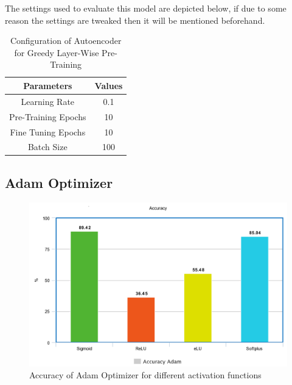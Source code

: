 \documentclass[12pt, a4paper]{report}
\begin{document}
\clearpage
The settings used to evaluate this model are depicted below, if due to some reason the settings are tweaked then it will be mentioned beforehand.\\ 

\begin{table}[ht]
\centering
\begin{tabular}{|c|c|}
\hline
\textbf{Parameters} & \textbf{Values} \\ \hline
Learning Rate       & 0.1             \\ \hline
Pre-Training Epochs & 10              \\ \hline
Fine Tuning Epochs  & 10              \\ \hline
Batch Size          & 100             \\ \hline
\end{tabular}
\caption{Configuration of Autoencoder for Greedy Layer-Wise Pre-Training}
\label{config_auto_greedy}
\end{table}

\subsection {Adam Optimizer}
\begin{figure}[ht]
\centering
\captionsetup{justification=centering,margin=2cm}
\includegraphics[width=13cm]{adam_accuracy_greedy.png}
\caption{ Accuracy of Adam Optimizer for different activation functions}
\label{fig:accuracy_adam_greedy}
\end{figure}
\end{document}
